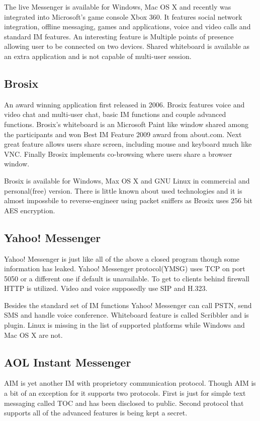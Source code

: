 The live Messenger is available for Windows, Mac OS X and recently was integrated into Microsoft's game console Xbox 360. It features social network integration, offline messaging, games and applications, voice and video calls and standard IM features. An interesting feature is Multiple points of presence allowing user to be connected on two devices. Shared whiteboard is available as an extra application and is not capable of multi-user session.   

\subsection*{Brosix}
An award winning application first released in 2006. Brosix features voice and video chat and multi-user chat, basic IM functions and couple advanced functions. Brosix's whiteboard is an Microsoft Paint like window shared among the participants and won Best IM Feature 2009 award from about.com. Next great feature allows users share screen, including mouse and keyboard much like VNC. Finally Brosix implements co-browsing where users share a browser window. 

Brosix is available for Windows, Max OS X and GNU Linux in commercial and personal(free) version. There is little known about used technologies and it is almost impossbile to reverse-engineer using packet sniffers as Brosix uses 256 bit AES encryption.

\subsection*{Yahoo! Messenger}
Yahoo! Messenger is just like all of the above a closed program though some information has leaked\cite{wikipediaYahoo}. Yahoo! Messenger protocol(YMSG) uses TCP on port 5050 or a different one if default is unavailable. To get to clients behind firewall HTTP is utilized. Video and voice supposedly use SIP and H.323.

Besides the standard set of IM functions Yahoo! Messenger can call PSTN, send SMS and handle voice conference. Whiteboard feature is called Scribbler and is plugin. Linux is missing in the list of supported platforms while Windows and Mac OS X are not.

\subsection*{AOL Instant Messenger}
AIM is yet another IM with proprietory communication protocol. Though AIM is a bit of an exception for it supports two protocols. First is just for simple text messaging called TOC and has been disclosed to public. Second protocol that supports all of the advanced features is being kept a secret.

